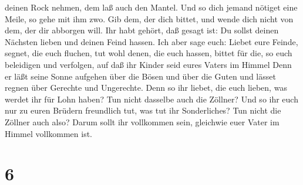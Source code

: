 deinen Rock nehmen, dem laß auch den Mantel.  Und so dich
jemand nötiget eine Meile, so gehe mit ihm zwo.  Gib dem,
der dich bittet, und wende dich nicht von dem, der dir abborgen will.
 Ihr habt gehört, daß gesagt ist: Du sollst deinen Nächsten
lieben und deinen Feind hassen.  Ich aber sage euch: Liebet
eure Feinde, segnet, die euch fluchen, tut wohl denen, die euch hassen,
bittet für die, so euch beleidigen und verfolgen,  auf daß
ihr Kinder seid eures Vaters im Himmel Denn er läßt seine Sonne aufgehen
über die Bösen und über die Guten und lässet regnen über Gerechte und
Ungerechte.  Denn so ihr liebet, die euch lieben, was
werdet ihr für Lohn haben? Tun nicht dasselbe auch die Zöllner?
 Und so ihr euch nur zu euren Brüdern freundlich tut, was
tut ihr Sonderliches? Tun nicht die Zöllner auch also? 
Darum sollt ihr vollkommen sein, gleichwie euer Vater im Himmel
vollkommen ist.

\hypertarget{section-5}{%
\section{6}\label{section-5}}

